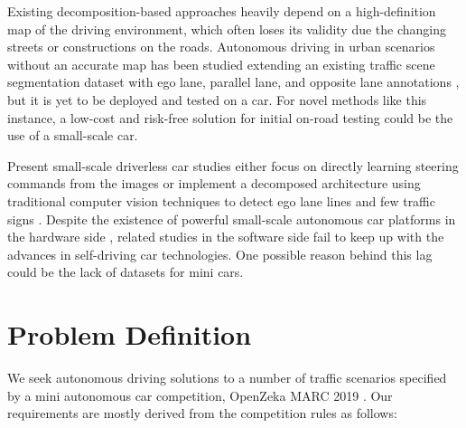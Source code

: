 Existing decomposition-based approaches heavily depend on a high-definition map
of the driving environment, which often loses its validity due the changing
streets or constructions on the roads. Autonomous driving in urban scenarios
without an accurate map has been studied extending an existing traffic scene
segmentation dataset with ego lane, parallel lane, and opposite lane
annotations \cite{Meyer2018DeepSL}, but it is yet to be deployed and tested on
a car. For novel methods like this instance, a low-cost and risk-free solution
for initial on-road testing could be the use of a small-scale car.

Present small-scale driverless car studies either focus on directly learning
steering commands from the images \cite{Bechtel2017DeepPicarAL,
Do2018RealTimeSC} or implement a decomposed architecture using traditional
computer vision techniques to detect ego lane lines and few traffic signs
\cite{Blaga2018MiniatureAV}. Despite the existence of powerful small-scale
autonomous car platforms in the hardware side \cite{Karaman2017ProjectbasedCA},
related studies in the software side fail to keep up with the advances in
self-driving car technologies. One possible reason behind this lag could be the
lack of datasets for mini cars.


\section{Problem Definition}

We seek autonomous driving solutions to a number of traffic scenarios specified
by a mini autonomous car competition, OpenZeka MARC 2019 \cite{OpenZekaMARC}.
Our requirements are mostly derived from the competition rules as follows:

